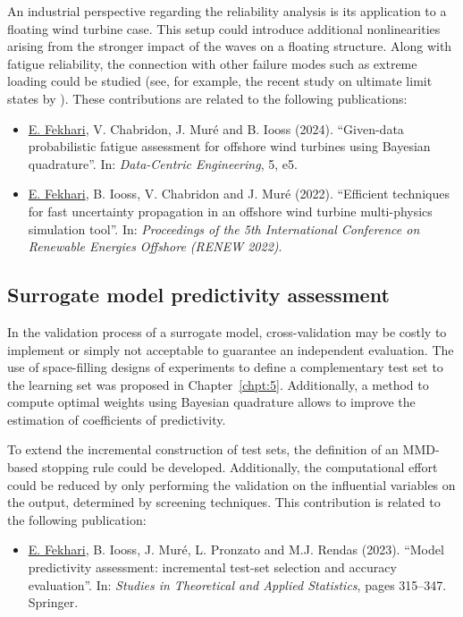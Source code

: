 An industrial perspective regarding the reliability analysis is its application to a floating wind turbine case. 
This setup could introduce additional nonlinearities arising from the stronger impact of the waves on a floating structure. 
Along with fatigue reliability, the connection with other failure modes such as extreme loading could be studied (see, for example, the recent study on ultimate limit states by \citealp{wang_schar_2023_uls}). 
These contributions are related to the following publications:
\begin{itemize}
    \footnotesize
    \item[\ding{125}] \underline{E. Fekhari}, V. Chabridon, J. Mur\'{e} and B. Iooss (2024). ``Given-data probabilistic fatigue assessment for offshore wind turbines using Bayesian quadrature''. In: \textit{Data-Centric Engineering}, 5, e5.
    \item[\ding{125}] \underline{E. Fekhari}, B. Iooss, V. Chabridon and J. Mur\'{e} (2022). ``Efficient techniques for fast uncertainty propagation in an offshore wind turbine multi-physics simulation tool''. In: \textit{Proceedings of the 5th International Conference on Renewable Energies Offshore (RENEW 2022)}.
\end{itemize}

\subsection*{Surrogate model predictivity assessment}

In the validation process of a surrogate model, cross-validation may be costly to implement or simply not acceptable to guarantee an independent evaluation.  
The use of space-filling designs of experiments to define a complementary test set to the learning set was proposed in Chapter~\ref{chpt:5}. 
Additionally, a method to compute optimal weights using Bayesian quadrature allows to improve the estimation of coefficients of predictivity. 

To extend the incremental construction of test sets, the definition of an MMD-based stopping rule could be developed. 
Additionally, the computational effort could be reduced by only performing the validation on the influential variables on the output, determined by screening techniques. 
This contribution is related to the following publication:
\begin{itemize}
    \footnotesize
    \item[\ding{125}] \underline{E. Fekhari}, B. Iooss, J. Mur\'{e}, L. Pronzato and M.J. Rendas (2023). ``Model predictivity assessment: incremental test-set selection and accuracy evaluation''. In: \textit{Studies in Theoretical and Applied Statistics}, pages 315--347. Springer.
\end{itemize}

